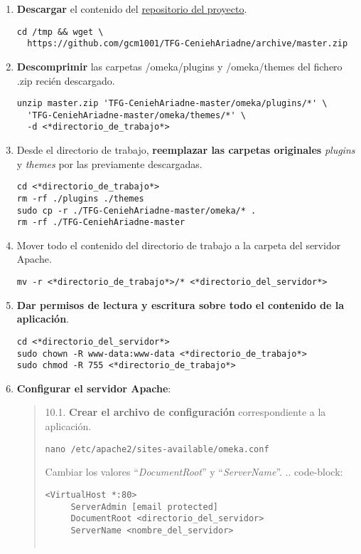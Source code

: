 \begin{enumerate}
\begin{verbatim}
cd <directorio_de_trabajo>
nano db.ini
\end{verbatim}
  No es necesario modificar los parámetros `prefix` o `port`.
\begin{verbatim}
[database]
host     = "localhost"
username = "usuario"
password = "contraseña"
dbname   = "omekadb"
prefix   = "omeka_"
charset  = "utf8"
;port     = ""
\end{verbatim}
\item
  \textbf{Descargar} el contenido del
  \href{https://github.com/gcm1001/TFG-CeniehAriadne}{repositorio del
  proyecto}.
\begin{verbatim}
cd /tmp && wget \
  https://github.com/gcm1001/TFG-CeniehAriadne/archive/master.zip
\end{verbatim}
\item
  \textbf{Descomprimir} las carpetas {/omeka/plugins} y {/omeka/themes}
  del fichero {.zip} recién descargado.
\begin{verbatim}
unzip master.zip 'TFG-CeniehAriadne-master/omeka/plugins/*' \
  'TFG-CeniehAriadne-master/omeka/themes/*' \
  -d <*directorio_de_trabajo*>
\end{verbatim}
\item
  Desde el directorio de trabajo, \textbf{reemplazar las carpetas
  originales} \emph{plugins} y \emph{themes} por las previamente
  descargadas.
\begin{verbatim}
cd <*directorio_de_trabajo*>
rm -rf ./plugins ./themes
sudo cp -r ./TFG-CeniehAriadne-master/omeka/* .
rm -rf ./TFG-CeniehAriadne-master
\end{verbatim}
\item
  Mover todo el contenido del directorio de trabajo a la carpeta del
  servidor Apache.
\begin{verbatim}
mv -r <*directorio_de_trabajo*>/* <*directorio_del_servidor*>
\end{verbatim}
\item
  \textbf{Dar permisos de lectura y escritura sobre todo el contenido de
  la aplicación}.
\begin{verbatim}
cd <*directorio_del_servidor*>
sudo chown -R www-data:www-data <*directorio_de_trabajo*>
sudo chmod -R 755 <*directorio_de_trabajo*>
\end{verbatim}
\item
  \textbf{Configurar el servidor Apache}:
\begin{quote}
10.1. \textbf{Crear el archivo de configuración} correspondiente a la
aplicación.
\begin{verbatim}
nano /etc/apache2/sites-available/omeka.conf
\end{verbatim}
Cambiar los valores ``\emph{DocumentRoot}'' y ``\emph{ServerName}''. ..
code-block:
\begin{verbatim}
<VirtualHost *:80>
     ServerAdmin [email protected]
     DocumentRoot <directorio_del_servidor>
     ServerName <nombre_del_servidor>


\end{verbatim}
\end{quote}
\end{enumerate}
